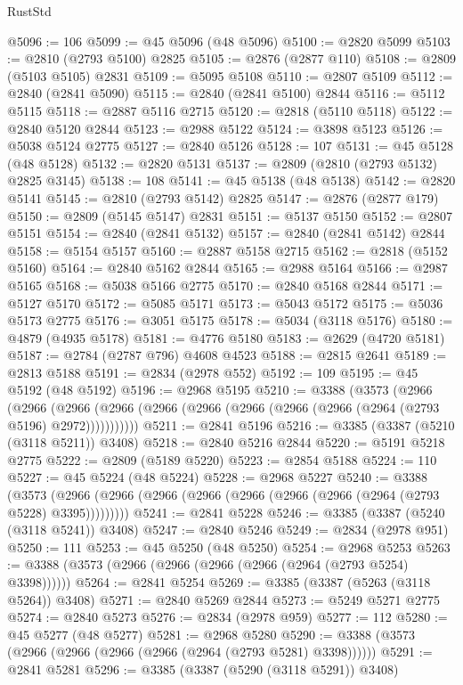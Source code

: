 \begin{lexlean}{RustStd}
\begin{coremodule}
@5096 := 106
@5099 := @45 @5096 (@48 @5096)
@5100 := @2820 @5099
@5103 := @2810 (@2793 @5100) @2825
@5105 := @2876 (@2877 @110)
@5108 := @2809 (@5103 @5105) @2831
@5109 := @5095 @5108
@5110 := @2807 @5109
@5112 := @2840 (@2841 @5090)
@5115 := @2840 (@2841 @5100) @2844
@5116 := @5112 @5115
@5118 := @2887 @5116 @2715
@5120 := @2818 (@5110 @5118)
@5122 := @2840 @5120 @2844
@5123 := @2988 @5122
@5124 := @3898 @5123
@5126 := @5038 @5124 @2775
@5127 := @2840 @5126
@5128 := 107
@5131 := @45 @5128 (@48 @5128)
@5132 := @2820 @5131
@5137 := @2809 (@2810 (@2793 @5132) @2825 @3145)
@5138 := 108
@5141 := @45 @5138 (@48 @5138)
@5142 := @2820 @5141
@5145 := @2810 (@2793 @5142) @2825
@5147 := @2876 (@2877 @179)
@5150 := @2809 (@5145 @5147) @2831
@5151 := @5137 @5150
@5152 := @2807 @5151
@5154 := @2840 (@2841 @5132)
@5157 := @2840 (@2841 @5142) @2844
@5158 := @5154 @5157
@5160 := @2887 @5158 @2715
@5162 := @2818 (@5152 @5160)
@5164 := @2840 @5162 @2844
@5165 := @2988 @5164
@5166 := @2987 @5165
@5168 := @5038 @5166 @2775
@5170 := @2840 @5168 @2844
@5171 := @5127 @5170
@5172 := @5085 @5171
@5173 := @5043 @5172
@5175 := @5036 @5173 @2775
@5176 := @3051 @5175
@5178 := @5034 (@3118 @5176)
@5180 := @4879 (@4935 @5178)
@5181 := @4776 @5180
@5183 := @2629 (@4720 @5181)
@5187 := @2784 (@2787 @796) @4608 @4523
@5188 := @2815 @2641
@5189 := @2813 @5188
@5191 := @2834 (@2978 @552)
@5192 := 109
@5195 := @45 @5192 (@48 @5192)
@5196 := @2968 @5195
@5210 := @3388
    (@3573
      (@2966
        (@2966
          (@2966 (@2966 (@2966 (@2966 (@2966 (@2966 (@2966 (@2964 (@2793 @5196) @2972)))))))))))
@5211 := @2841 @5196
@5216 := @3385 (@3387 (@5210 (@3118 @5211)) @3408)
@5218 := @2840 @5216 @2844
@5220 := @5191 @5218 @2775
@5222 := @2809 (@5189 @5220)
@5223 := @2854 @5188
@5224 := 110
@5227 := @45 @5224 (@48 @5224)
@5228 := @2968 @5227
@5240 := @3388
    (@3573 (@2966 (@2966 (@2966 (@2966 (@2966 (@2966 (@2966 (@2964 (@2793 @5228) @3395)))))))))
@5241 := @2841 @5228
@5246 := @3385 (@3387 (@5240 (@3118 @5241)) @3408)
@5247 := @2840 @5246
@5249 := @2834 (@2978 @951)
@5250 := 111
@5253 := @45 @5250 (@48 @5250)
@5254 := @2968 @5253
@5263 := @3388 (@3573 (@2966 (@2966 (@2966 (@2966 (@2964 (@2793 @5254) @3398))))))
@5264 := @2841 @5254
@5269 := @3385 (@3387 (@5263 (@3118 @5264)) @3408)
@5271 := @2840 @5269 @2844
@5273 := @5249 @5271 @2775
@5274 := @2840 @5273
@5276 := @2834 (@2978 @959)
@5277 := 112
@5280 := @45 @5277 (@48 @5277)
@5281 := @2968 @5280
@5290 := @3388 (@3573 (@2966 (@2966 (@2966 (@2966 (@2964 (@2793 @5281) @3398))))))
@5291 := @2841 @5281
@5296 := @3385 (@3387 (@5290 (@3118 @5291)) @3408)

\end{coremodule}
\end{lexlean}
